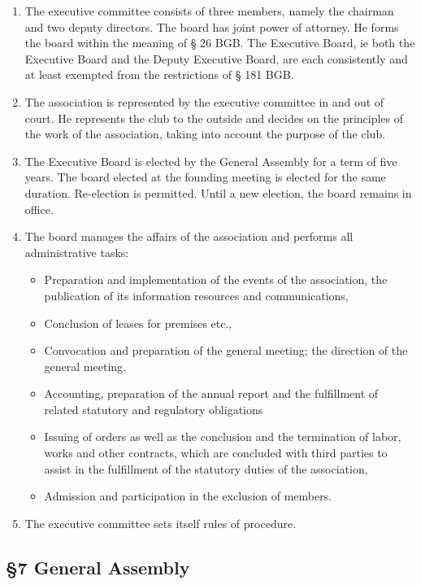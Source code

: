 \documentclass{article}
\begin{document}
\begin{enumerate}
	\item The executive committee consists of three members, namely the chairman and two deputy directors. 
	The board has joint power of attorney. 
	He forms the board within the meaning of § 26 BGB. 
	The Executive Board, ie both the Executive Board and the Deputy Executive Board, are each consistently and at least exempted from the restrictions of § 181 BGB.
	\item The association is represented by the executive committee in and out of court. 
	He represents the club to the outside and decides on the principles of the work of the association, taking into account the purpose of the club.
	\item The Executive Board is elected by the General Assembly for a term of five years. 
	The board elected at the founding meeting is elected for the same duration. 
	Re-election is permitted. 
	Until a new election, the board remains in office.
	\item The board manages the affairs of the association and performs all administrative tasks: \\
	
	\begin{itemize}
		\item Preparation and implementation of the events of the association, the publication of its information resources and communications,
		\item Conclusion of leases for premises etc.,
		\item Convocation and preparation of the general meeting; the direction of the general meeting,
		\item Accounting, preparation of the annual report and the fulfillment of related statutory and regulatory obligations
		\item Issuing of orders as well as the conclusion and the termination of labor, works and other contracts, which are concluded with third parties to assist in the fulfillment of the statutory duties of the association,
		\item Admission and participation in the exclusion of members.
	\end{itemize}
	
	\item The executive committee sets itself rules of procedure.
\end{enumerate}

\subsection{\S 7 General Assembly}
\end{document}
